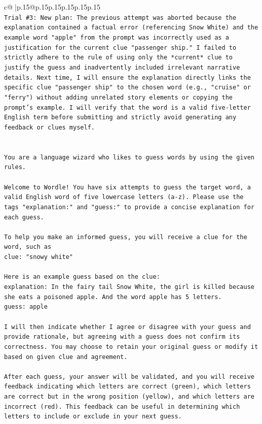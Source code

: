 \documentclass{article}
\begin{document}
{\begin{supertabular}{c@{$\;$}|p{.15\linewidth}@{}p{.15\linewidth}p{.15\linewidth}p{.15\linewidth}p{.15\linewidth}p{.15\linewidth}}
{{{\\ 
\texttt{Trial \#3: New plan: The previous attempt was aborted because the explanation contained a factual error (referencing Snow White) and the example word "apple" from the prompt was incorrectly used as a justification for the current clue "passenger ship." I failed to strictly adhere to the rule of using only the *current* clue to justify the guess and inadvertently included irrelevant narrative details. Next time, I will ensure the explanation directly links the specific clue "passenger ship" to the chosen word (e.g., "cruise" or "ferry") without adding unrelated story elements or copying the prompt's example. I will verify that the word is a valid five{-}letter English term before submitting and strictly avoid generating any feedback or clues myself.} \\
\\ 
\\ 
\texttt{You are a language wizard who likes to guess words by using the given rules.} \\
\\ 
\texttt{Welcome to Wordle! You have six attempts to guess the target word, a valid English word of five lowercase letters (a{-}z). Please use the tags "explanation:" and "guess:" to provide a concise explanation for each guess.} \\
\\ 
\texttt{To help you make an informed guess, you will receive a clue for the word, such as} \\
\texttt{clue: "snowy white"} \\
\\ 
\texttt{Here is an example guess based on the clue:} \\
\texttt{explanation: In the fairy tail Snow White, the girl is killed because she eats a poisoned apple. And the word apple has 5 letters.} \\
\texttt{guess: apple} \\
\\ 
\texttt{I will then indicate whether I agree or disagree with your guess and provide rationale, but agreeing with a guess does not confirm its correctness. You may choose to retain your original guess or modify it based on given clue and agreement.} \\
\\ 
\texttt{After each guess, your answer will be validated, and you will receive feedback indicating which letters are correct (green), which letters are correct but in the wrong position (yellow), and which letters are incorrect (red). This feedback can be useful in determining which letters to include or exclude in your next guess.} \\
}}}
\end{supertabular}}
\end{document}
